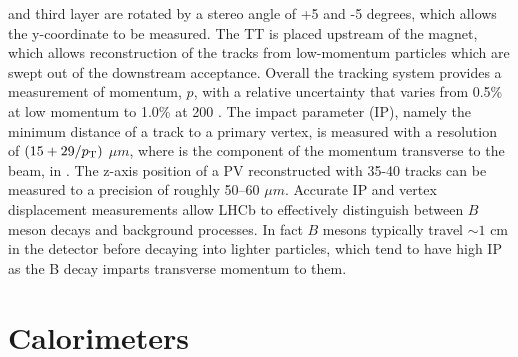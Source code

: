 and third layer are rotated by a stereo angle of +5 and -5 degrees, which allows the y-coordinate to be measured. 
The TT is placed upstream of the magnet, which allows reconstruction of the tracks from low-momentum particles
which are swept out of the downstream acceptance. Overall the tracking system provides a measurement of momentum, $p$,  with a relative uncertainty that varies from 0.5\% at low momentum to 1.0\% at 200 \gevc. 
The impact parameter (IP), namely the minimum distance of a track to a primary vertex, is measured 
with a resolution of $(15 + 29/\mbox{$p_{\rm T}$})$ $\mu m$, where \pt is the component of the momentum transverse to the 
beam, in \gevc. The z-axis position of a PV reconstructed with 35-40 tracks can be measured to a precision of roughly 50--60 $\mu m$. Accurate IP and vertex displacement measurements allow LHCb to effectively distinguish 
between $B$ meson decays and background processes. In fact $B$ mesons typically travel $\sim 1$ cm in
the detector before decaying into lighter particles, which tend to have high IP as the B decay imparts
transverse momentum to them.


\section{Calorimeters}
\label{sec:calorimeters}

